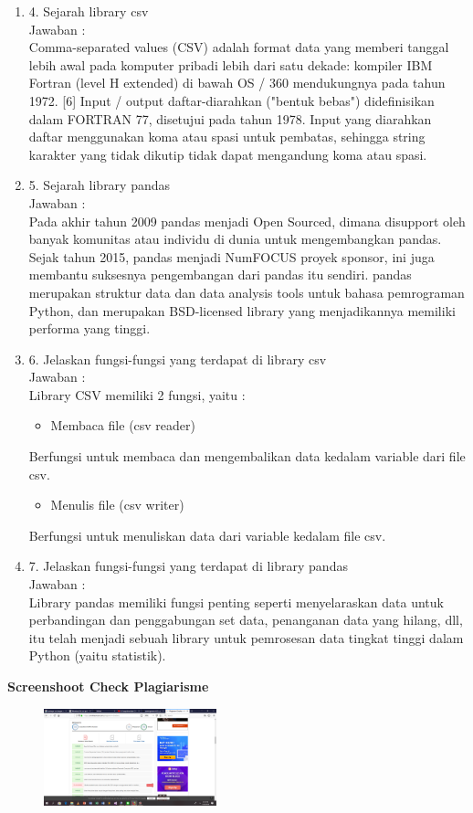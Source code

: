 \begin{enumerate}
\item 4. Sejarah library csv\\
Jawaban :\\
Comma-separated values (CSV) adalah format data yang memberi tanggal lebih awal pada komputer pribadi lebih dari satu dekade: kompiler IBM Fortran (level H extended) di bawah OS / 360 mendukungnya pada tahun 1972. [6] Input / output daftar-diarahkan ("bentuk bebas") didefinisikan dalam FORTRAN 77, disetujui pada tahun 1978. Input yang diarahkan daftar menggunakan koma atau spasi untuk pembatas, sehingga string karakter yang tidak dikutip tidak dapat mengandung koma atau spasi.

\item 5. Sejarah library pandas\\
Jawaban :\\
Pada akhir tahun 2009 pandas menjadi Open Sourced, dimana disupport oleh banyak komunitas atau individu di dunia untuk mengembangkan pandas. Sejak tahun 2015, pandas menjadi NumFOCUS proyek sponsor, ini juga membantu suksesnya pengembangan dari pandas itu sendiri. pandas merupakan struktur data dan data analysis tools untuk bahasa pemrograman Python, dan merupakan BSD-licensed library yang menjadikannya memiliki performa yang tinggi.


\item 6. Jelaskan  fungsi-fungsi yang terdapat di library csv\\
Jawaban :\\
Library CSV memiliki 2 fungsi, yaitu :

\begin{itemize}
\item Membaca file (csv reader)
\end{itemize}
Berfungsi untuk membaca dan mengembalikan data kedalam variable dari file csv.
\begin{itemize}
\item Menulis file (csv writer)
\end{itemize}
Berfungsi untuk menuliskan data dari variable kedalam file csv.

\item 7. Jelaskan  fungsi-fungsi yang terdapat di library pandas\\
Jawaban :\\
Library pandas memiliki fungsi penting seperti menyelaraskan data untuk perbandingan dan penggabungan set data, penanganan data yang hilang, dll, itu telah menjadi sebuah library untuk pemrosesan data tingkat tinggi dalam Python (yaitu statistik).

\end{enumerate}

\textbf{Screenshoot Check Plagiarisme}

\begin{figure}[H]
 \includegraphics[width=5cm]{figures/4/1174074/Teori/plagiarisme.png}
 \centering
\end{figure}
